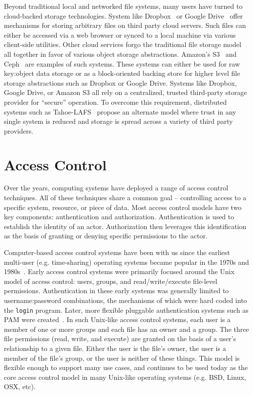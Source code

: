 Beyond traditional local and networked file systems, many users have
turned to cloud-backed storage technologies. System like
Dropbox~\cite{dropbox} or Google Drive~\cite{google-drive} offer
mechanisms for storing arbitrary files on third party cloud
servers. Such files can either be accessed via a web browser or synced
to a local machine via various client-side utilities. Other cloud
services forgo the traditional file storage model all together in
favor of various object storage abstractions. Amazon's
S3~\cite{amazon-s3} and Ceph~\cite{ceph} are examples of such
systems. These systems can either be used for raw key:object data
storage or as a block-oriented backing store for higher level file
storage abstractions such as Dropbox or Google Drive. Systems like
Dropbox, Google Drive, or Amazon S3 all rely on a centralized, trusted
third-party storage provider for ``secure'' operation. To overcome
this requirement, distributed systems such as
Tahoe-LAFS~\cite{wilcox-o'hearn2008} propose an alternate model where
trust in any single system is reduced and storage is spread across a
variety of third party providers.

\section{Access Control}
\label{chap:background:ac}

Over the years, computing systems have deployed a range of access
control techniques. All of these techniques share a common goal --
controlling access to a specific system, resource, or piece of
data. Most access control models have two key components:
authentication and authorization.  Authentication is used to establish
the identity of an actor. Authorization then leverages this
identification as the basis of granting or denying specific
permissions to the actor.

Computer-based access control systems have been with us since the
earliest multi-user (e.g. time-sharing) operating systems became
popular in the 1970s and 1980s~\cite{saltzer1974}. Early access
control systems were primarily focused around the Unix model of access
control: users, groups, and read/write/execute file-level
permissions. Authentication in these early systems was generally
limited to username:password combinations, the mechanisms of which
were hard coded into the \texttt{login} program. Later, more flexible
pluggable authentication systems such as PAM were
created~\cite{samar1996, linux-pam, openpam}. In such Unix-like access
control systems, each user is a member of one or more groups and each
file has an owner and a group. The three file permissions (read,
write, and execute) are granted on the basis of a user's relationship
to a given file. Either the user is the file's owner, the user is a
member of the file's group, or the user is neither of these
things. This model is flexible enough to support many use cases, and
continues to be used today as the core access control model in many
Unix-like operating systems (e.g. BSD, Linux, OSX, etc).

